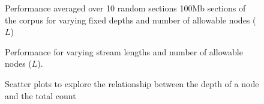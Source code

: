 \begin{figure}[t] 
	\begin{center}
		\caption{Performance averaged over 10 random sections  100Mb sections of the corpus for varying fixed depths and number of allowable nodes ($L$) }
		\label{fig:varying_depths}
	\end{center} 
\end{figure} 


\begin{figure}[t] 
	\begin{center}
		\caption{Performance for varying stream lengths and number of allowable nodes ($L$).}
		\label{fig:varying_stream_length}
	\end{center} 
\end{figure} 

\begin{figure}[t] 
	\begin{center}
		\caption{Scatter plots to explore the relationship between the depth of a node and the total count}
		\label{fig:restaurant_plots}
	\end{center} 
\end{figure} 

